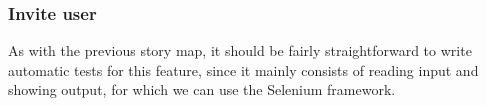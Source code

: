 \documentclass[10pt,a4paper,BCOR12mm, headexclude, footexclude,
  twoside, openright]{scrartcl}
\numberwithin{equation}{section} %
\numberwithin{figure}{section} %
\numberwithin{table}{section} %
\begin{document}
\subsubsection*{Invite user}
As with the previous story map, it should be fairly straightforward to write
automatic tests for this feature, since it mainly consists of reading input and
showing output, for which we can use the Selenium framework.



\end{document}
